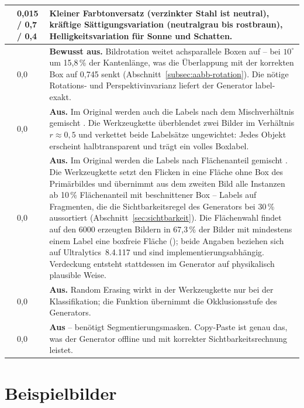 \begin{table}[htbp]
\begin{tabularx}{\textwidth}{@{}L{0.155\textwidth}L{0.05\textwidth}X@{}}
 & 0,015 / 0,7 / 0,4 &
Kleiner Farbtonversatz (verzinkter Stahl ist neutral), kräftige
Sättigungsvariation (neutralgrau bis rostbraun), Helligkeitsvariation für
Sonne und Schatten. \\
\midrule
{}   & 0,0 &
\textbf{Bewusst aus.} Bildrotation weitet achsparallele Boxen auf -- bei
$10^\circ$ um 15,8\,\% der Kantenlänge, was die Überlappung mit der korrekten Box
auf 0,745 senkt (Abschnitt~\ref{subsec:aabb-rotation}). Die nötige Rotations- und
Perspektivinvarianz liefert der Generator label-exakt. \\
 & 0,0 &
\textbf{Aus.} Im Original werden auch die Labels nach dem Mischverhältnis
gemischt \parencite{zhang2018mixup}. Die Werkzeugkette überblendet zwei Bilder
im Verhältnis $r \approx 0{,}5$ und verkettet beide Labelsätze ungewichtet:
Jedes Objekt erscheint halbtransparent und trägt ein volles Boxlabel. \\
 & 0,0 &
\textbf{Aus.} Im Original werden die Labels nach Flächenanteil gemischt
\parencite{yun2019cutmix}. Die Werkzeugkette setzt den Flicken in eine Fläche
ohne Box des Primärbildes und übernimmt aus dem zweiten Bild alle Instanzen ab
10\,\% Flächenanteil mit beschnittener Box -- Labels auf Fragmenten, die die
Sichtbarkeitsregel des Generators bei 30\,\% aussortiert
(Abschnitt~\ref{sec:sichtbarkeit}). Die Flächenwahl findet auf den 6000
erzeugten Bildern in 67,3\,\% der Bilder mit mindestens einem Label eine boxfreie Fläche
(); beide Angaben beziehen sich auf
Ultralytics~8.4.117 und sind implementierungsabhängig. Verdeckung entsteht
stattdessen im Generator auf physikalisch plausible Weise. \\
 & 0,0 &
\textbf{Aus.} Random Erasing \parencite{zhong2020erasing} wirkt in der
Werkzeugkette nur bei der Klassifikation; die Funktion übernimmt die
Okklusionsstufe des Generators. \\
 & 0,0 &
\textbf{Aus} -- benötigt Segmentierungsmasken. Copy-Paste
\parencite{ghiasi2021} ist genau das, was der Generator offline und mit
korrekter Sichtbarkeitsrechnung leistet. \\
\bottomrule
\end{tabularx}
\end{table}


\section{Beispielbilder}

